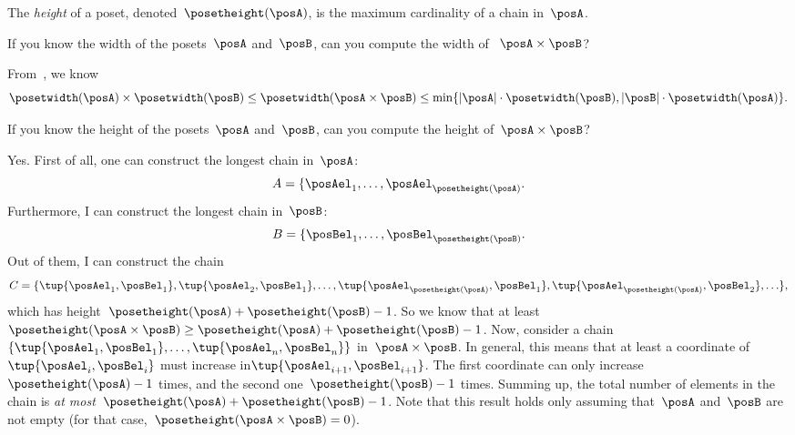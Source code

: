 \begin{definition}
  \label{def:poset-height}
  The \emph{height} of a poset, denoted~$\posetheight(\posA)$, is the maximum cardinality of a chain in~$\posA$.
\end{definition}

\begin{exercise}\label{ex:width}
  If you know the width of the posets~$\posA$ and~$\posB$, can you compute the width of ~$\posA\times\posB$?
\end{exercise}
\begin{solution}
  From~\cite{bezrukovantichains}, we know
  \begin{equation*}
    \posetwidth(\posA)\times \posetwidth(\posB)\leq \posetwidth(\posA\times \posB)\leq \min \{ \vert \posA\vert \cdot \posetwidth(\posB),\vert \posB \vert \cdot \posetwidth(\posA)\}.
  \end{equation*}
\end{solution}

\begin{exercise}\label{ex:height}
  If you know the height of the posets~$\posA$ and~$\posB$, can you compute the height of~$\posA\times\posB$?
\end{exercise}

\begin{solution}
  Yes. First of all, one can construct the longest chain in~$\posA$:
\begin{equation*}
  A=\{\posAel_1,\ldots, \posAel_{\posetheight(\posA)}.
\end{equation*}
  Furthermore, I can construct the longest chain in~$\posB$:
  \begin{equation*}
  B=\{\posBel_1,\ldots, \posBel_{\posetheight(\posB)}.
\end{equation*}
  Out of them, I can construct the chain
  \begin{equation*}
    C=\{ \tup{\posAel_1,\posBel_1},\tup{\posAel_2,\posBel_1},\ldots, \tup{\posAel_{\posetheight(\posA)}, \posBel_1}, \tup{\posAel_{\posetheight(\posA)}, \posBel_2},\ldots\},
  \end{equation*}
  which has height~$\posetheight(\posA)+\posetheight(\posB)-1$. So we know that at least~$\posetheight(\posA\times \posB)\geq \posetheight(\posA)+\posetheight(\posB)-1$.
  Now, consider a chain~$\{\tup{\posAel_1,\posBel_1},\ldots, \tup{\posAel_n,\posBel_n}\}$ in~$\posA\times \posB$.
  In general, this means that at least a coordinate of~$\tup{\posAel_{i},\posBel_{i}}$ must increase in$\tup{\posAel_{i+1},\posBel_{i+1}}$.
  The first coordinate can only increase~$\posetheight(\posA)-1$ times, and the second one~$\posetheight(\posB)-1$ times. Summing up, the total number of elements in the chain is \emph{at most}~$\posetheight(\posA)+\posetheight(\posB)-1$.
  Note that this result holds only assuming that~$\posA$ and~$\posB$ are not empty (for that case,~$\posetheight(\posA\times \posB)=0$).
\end{solution}

